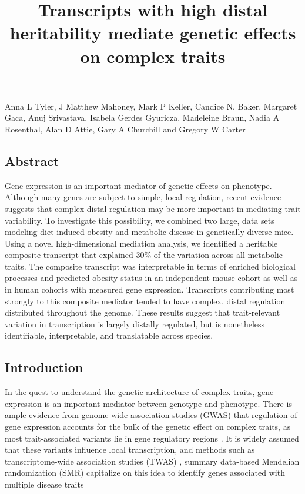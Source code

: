 \documentclass[
]{article}
\title{Transcripts with high distal heritability mediate genetic effects
on complex traits}
\author{}
\date{\vspace{-2.5em}}
\begin{document}
\maketitle

Anna L Tyler, J Matthew Mahoney, Mark P Keller, Candice N. Baker,
Margaret Gaca, Anuj Srivastava, Isabela Gerdes Gyuricza, Madeleine
Braun, Nadia A Rosenthal, Alan D Attie, Gary A Churchill and Gregory W
Carter

\subsection{Abstract}\label{abstract}

Gene expression is an important mediator of genetic effects on
phenotype. Although many genes are subject to simple, local regulation,
recent evidence suggests that complex distal regulation may be more
important in mediating trait variability. To investigate this
possibility, we combined two large, data sets modeling diet-induced
obesity and metabolic disease in genetically diverse mice. Using a novel
high-dimensional mediation analysis, we identified a heritable composite
transcript that explained 30\% of the variation across all metabolic
traits. The composite transcript was interpretable in terms of enriched
biological processes and predicted obesity status in an independent
mouse cohort as well as in human cohorts with measured gene expression.
Transcripts contributing most strongly to this composite mediator tended
to have complex, distal regulation distributed throughout the genome.
These results suggest that trait-relevant variation in transcription is
largely distally regulated, but is nonetheless identifiable,
interpretable, and translatable across species.

\subsection{Introduction}\label{introduction}

In the quest to understand the genetic architecture of complex traits,
gene expression is an important mediator between genotype and phenotype.
There is ample evidence from genome-wide association studies (GWAS) that
regulation of gene expression accounts for the bulk of the genetic
effect on complex traits, as most trait-associated variants lie in gene
regulatory regions \cite{pmid22955828, 
pmid25363779, pmid21617055, pmid19474294, pmid24702953, 
pmid24316577, pmid27126046}. It is widely assumed that these variants
influence local transcription, and methods such as transcriptome-wide
association studies (TWAS)
\cite{pmid33020666, pmid26258848, pmid27019110, pmid26854917}, summary
data-based Mendelian randomization (SMR) \cite{pmid27019110} capitalize
on this idea to identify genes associated with multiple disease traits
\cite{pmid29567659, pmid35533209, 
pmid27309819, pmid30950127}
\end{document}
